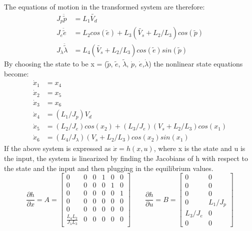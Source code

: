 	The equations of motion in the transformed system are therefore:
	\begin{subequations}
	\begin{align}
		J_p\ddot{\tilde{p}} &= L_1\tilde{V_d} \\
		J_e\ddot{\tilde{e}} &= L_2cos(\tilde{e}) + L_3(\tilde{V_s}+L_2/L_3)cos(\tilde{p}) \\
		J_{\lambda}\ddot{\tilde{\lambda}} &= L_4(\tilde{V_s}+L_2/L_3)cos(\tilde{e})sin(\tilde{p})
	\end{align}
	\end{subequations}
	By choosing the state to be x = ($\tilde{p}$, $\tilde{e}$, $\tilde{\lambda}$, \textit{$\dot{p}$, $\dot{e}$,$\dot{\lambda}$}) the nonlinear state equations become:
	\begin{subequations}
	\begin{align}
		\dot{x}_1 &= x_4 \\
		\dot{x}_2 &= x_5 \\
		\dot{x}_3 &= x_6 \\
		\dot{x}_4 &= (L_1/J_p) V_d \\
		\dot{x}_5 &= (L_2/J_e)cos(x_2) + (L_3/J_e)(V_s + L_2 / L_3)cos(x_1) \\
		\dot{x}_6 &= (L_4 / J_\lambda) (V_s + L_2 / L_3)cos(x_2)sin(x_1)
	\end{align}
	\end{subequations}
	If the above system is expressed as $\dot{x} = h(x, u)$, where x is the state and u is the input, the system is linearized by finding the Jacobians of h with respect to the state and the input and then plugging in the equilibrium values.
	\begin{equation}
		\frac{\partial h}{\partial x} = A =
		\begin{bmatrix}
			0 & 0 & 0 & 1 & 0 & 0 \\
			0 & 0 & 0 & 0 & 1 & 0 \\
			0 & 0 & 0 & 0 & 0 & 1 \\
			0 & 0 & 0 & 0 & 0 & 0 \\
			0 & 0 & 0 & 0 & 0 & 0 \\
			\frac{L_4L_2}{J_\lambda L_3} & 0 & 0 & 0 & 0 & 0 
		\end{bmatrix}
		\qquad
		\frac{\partial h}{\partial u} = B = 
		\begin{bmatrix}
			0 & 0 \\
			0 & 0 \\
			0 & 0 \\
			0 & L_1/J_p \\
			L_3/J_e & 0 \\
			0 & 0  
		\end{bmatrix}
	\end{equation}

